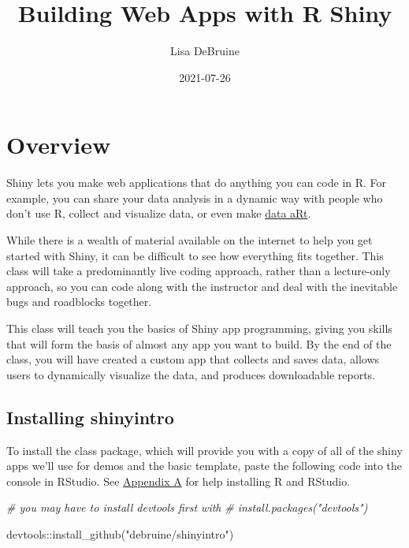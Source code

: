 \documentclass[
  oneside]{book}
\title{Building Web Apps with R Shiny}
\author{Lisa DeBruine}
\date{2021-07-26}
\newenvironment{Shaded}{\begin{snugshade}}{\end{snugshade}}
\newcommand{\CommentTok}[1]{\textcolor[rgb]{0.56,0.35,0.01}{\textit{#1}}}
\newcommand{\FunctionTok}[1]{\textcolor[rgb]{0.00,0.00,0.00}{#1}}
\newcommand{\NormalTok}[1]{#1}
\newcommand{\SpecialCharTok}[1]{\textcolor[rgb]{0.00,0.00,0.00}{#1}}
\newcommand{\StringTok}[1]{\textcolor[rgb]{0.31,0.60,0.02}{#1}}
\begin{document}
\maketitle

{
\setcounter{tocdepth}{1}
\tableofcontents
}
\hypertarget{overview}{%
\chapter*{Overview}\label{overview}}

Shiny lets you make web applications that do anything you can code in R. For example, you can share your data analysis in a dynamic way with people who don't use R, collect and visualize data, or even make \href{https://towardsdatascience.com/getting-started-with-generative-art-in-r-3bc50067d34b}{data aRt}.

While there is a wealth of material available on the internet to help you get started with Shiny, it can be difficult to see how everything fits together. This class will take a predominantly live coding approach, rather than a lecture-only approach, so you can code along with the instructor and deal with the inevitable bugs and roadblocks together.

This class will teach you the basics of Shiny app programming, giving you skills that will form the basis of almost any app you want to build. By the end of the class, you will have created a custom app that collects and saves data, allows users to dynamically visualize the data, and produces downloadable reports.

\hypertarget{installing-shinyintro}{%
\section{Installing shinyintro}\label{installing-shinyintro}}

To install the class package, which will provide you with a copy of all of the shiny apps we'll use for demos and the basic template, paste the following code into the console in RStudio. See \protect\hyperlink{installing-r}{Appendix A} for help installing R and RStudio.

\begin{Shaded}
\begin{Highlighting}[]
\CommentTok{\# you may have to install devtools first with }
\CommentTok{\# install.packages("devtools")}

\NormalTok{devtools}\SpecialCharTok{::}\FunctionTok{install\_github}\NormalTok{(}\StringTok{"debruine/shinyintro"}\NormalTok{)}
\end{Highlighting}
\end{Shaded}
\end{document}
